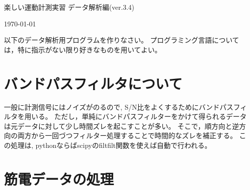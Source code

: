 \documentclass{jsarticle}
\def\version{3.4}
\begin{document}
\begin{center}
  {\LARGE 楽しい運動計測実習 データ解析編(ver.\version)}
\end{center}
\begin{flushright}
\today
\end{flushright}

以下のデータ解析用プログラムを作りなさい。
プログラミング言語については，特に指示がない限り好きなものを用いてよい。


\section{バンドパスフィルタについて}  
一般に計測信号にはノイズがのるので, S/N比をよくするためにバンドパスフィルタを用いる。
ただし，単純にバンドパスフィルターをかけて得られるデータは元データに対して少し時間ズレを起こすことが多い。
そこで，順方向と逆方向の両方から一回づつフィルター処理することで時間的なズレを補正する。
この処理は, pythonならばscipyのfiltfilt関数を使えば自動で行われる。

\section{筋電データの処理}
\end{document}
